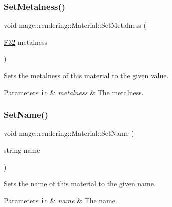 \subsubsection{\texorpdfstring{Set\+Metalness()}{SetMetalness()}}
{\footnotesize\ttfamily void mage\+::rendering\+::\+Material\+::\+Set\+Metalness (\begin{DoxyParamCaption}\item[{\hyperlink{namespacemage_aa97e833b45f06d60a0a9c4fc22ae02c0}{F32}}]{metalness }\end{DoxyParamCaption})\hspace{0.3cm}{\ttfamily [noexcept]}}

Sets the metalness of this material to the given value.


\begin{DoxyParams}[1]{Parameters}
\mbox{\tt in}  & {\em metalness} & The metalness. \\
\hline
\end{DoxyParams}
\hypertarget{classmage_1_1rendering_1_1_material_a5700b990bfd59c497e07ee6682ffbf06}{}\label{classmage_1_1rendering_1_1_material_a5700b990bfd59c497e07ee6682ffbf06} 
\subsubsection{\texorpdfstring{Set\+Name()}{SetName()}}
{\footnotesize\ttfamily void mage\+::rendering\+::\+Material\+::\+Set\+Name (\begin{DoxyParamCaption}\item[{string}]{name }\end{DoxyParamCaption})\hspace{0.3cm}{\ttfamily [noexcept]}}

Sets the name of this material to the given name.


\begin{DoxyParams}[1]{Parameters}
\mbox{\tt in}  & {\em name} & The name. \\
\hline
\end{DoxyParams}
\hypertarget{classmage_1_1rendering_1_1_material_a1a1ae2ba12c62c1d076f04124f1f64f6}{}\label{classmage_1_1rendering_1_1_material_a1a1ae2ba12c62c1d076f04124f1f64f6} 
